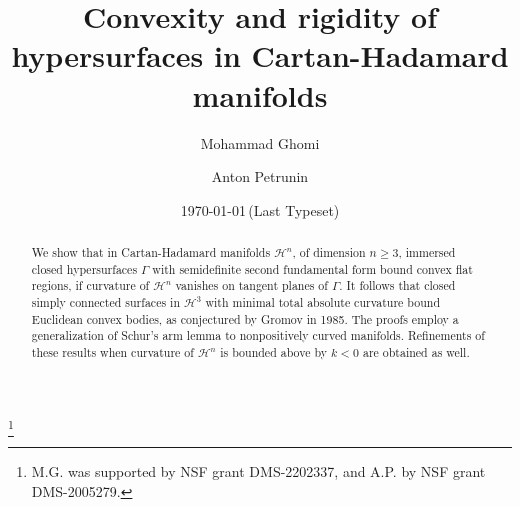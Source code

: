 \documentclass[11pt]{amsart}
\theoremstyle{definition}
\begin{document}
\setlength{\baselineskip}{1.2\baselineskip}

\title[Convexity and Rigidity in Cartan-Hadamard manifolds] 
{Convexity and rigidity of hypersurfaces in Cartan-Hadamard manifolds}

\author{Mohammad Ghomi}
\address{School of Mathematics, Georgia Institute of Technology,
Atlanta, GA 30332}


\author{Anton Petrunin}
\address{Department of Mathematics, Penn State U.
University Park, Pennsylvania 16802}


\begin{abstract}
We show that in Cartan-Hadamard manifolds $\mathcal{H}^n$, of dimension $n\geq 3$, immersed closed hypersurfaces $\Gamma$ with semidefinite second fundamental form bound convex flat regions, if  curvature of  $\mathcal{H}^n$ vanishes on tangent planes of $\Gamma$.
It follows that closed  simply connected surfaces  in $\mathcal{H}^3$ with minimal total absolute curvature bound Euclidean convex bodies, as conjectured by Gromov in 1985. The proofs employ a generalization of Schur's arm lemma to nonpositively curved manifolds. Refinements of these results when curvature of $\mathcal{H}^n$ is bounded above by $k<0$ are obtained as well.
\end{abstract}

\date{\today \,(Last Typeset)}
\thanks{M.G. was supported by NSF grant DMS-2202337, and A.P.  by NSF grant DMS-2005279.}



\maketitle

\end{document}
